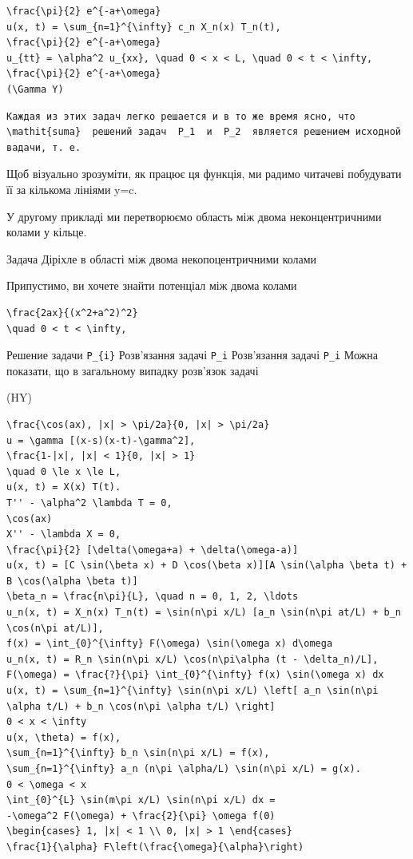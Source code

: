 \documentclass[
  ukrainian,
]{article}
\begin{document}
\begin{verbatim}
\frac{\pi}{2} e^{-a+\omega}
u(x, t) = \sum_{n=1}^{\infty} c_n X_n(x) T_n(t),
\frac{\pi}{2} e^{-a+\omega}
u_{tt} = \alpha^2 u_{xx}, \quad 0 < x < L, \quad 0 < t < \infty,
\frac{\pi}{2} e^{-a+\omega}
(\Gamma Y)
\end{verbatim}

\begin{verbatim}
Каждая из этих задач легко решается и в то же время ясно, что  \mathit{suma}  решений задач  P_1  и  P_2  является решением исходной вадачи, т. е.
\end{verbatim}

Щоб візуально зрозуміти, як працює ця функція, ми радимо читачеві
побудувати її за кількома лініями y=c.

У другому прикладі ми перетворюємо область між двома неконцентричними
колами у кільце.

Задача Діріхле в області між двома некопоцентричними колами

Припустимо, ви хочете знайти потенціал між двома колами

\begin{verbatim}
\frac{2ax}{(x^2+a^2)^2}
\quad 0 < t < \infty,
\end{verbatim}

Решение задачи \texttt{P\_\{i\}} Розв'язання задачі \texttt{P\_i}
Розв'язання задачі \texttt{P\_i} Можна показати, що в загальному випадку
розв'язок задачі

(HY)

\begin{verbatim}
\frac{\cos(ax), |x| > \pi/2a}{0, |x| > \pi/2a}
u = \gamma [(x-s)(x-t)-\gamma^2],
\frac{1-|x|, |x| < 1}{0, |x| > 1}
\quad 0 \le x \le L,
u(x, t) = X(x) T(t).
T'' - \alpha^2 \lambda T = 0,
\cos(ax)
X'' - \lambda X = 0,
\frac{\pi}{2} [\delta(\omega+a) + \delta(\omega-a)]
u(x, t) = [C \sin(\beta x) + D \cos(\beta x)][A \sin(\alpha \beta t) + B \cos(\alpha \beta t)]
\beta_n = \frac{n\pi}{L}, \quad n = 0, 1, 2, \ldots
u_n(x, t) = X_n(x) T_n(t) = \sin(n\pi x/L) [a_n \sin(n\pi at/L) + b_n \cos(n\pi at/L)],
f(x) = \int_{0}^{\infty} F(\omega) \sin(\omega x) d\omega
u_n(x, t) = R_n \sin(n\pi x/L) \cos(n\pi\alpha (t - \delta_n)/L],
F(\omega) = \frac{?}{\pi} \int_{0}^{\infty} f(x) \sin(\omega x) dx
u(x, t) = \sum_{n=1}^{\infty} \sin(n\pi x/L) \left[ a_n \sin(n\pi \alpha t/L) + b_n \cos(n\pi \alpha t/L) \right]
0 < x < \infty
u(x, \theta) = f(x),
\sum_{n=1}^{\infty} b_n \sin(n\pi x/L) = f(x),
\sum_{n=1}^{\infty} a_n (n\pi \alpha/L) \sin(n\pi x/L) = g(x).
0 < \omega < x
\int_{0}^{L} \sin(m\pi x/L) \sin(n\pi x/L) dx =
-\omega^2 F(\omega) + \frac{2}{\pi} \omega f(0)
\begin{cases} 1, |x| < 1 \\ 0, |x| > 1 \end{cases}
\frac{1}{\alpha} F\left(\frac{\omega}{\alpha}\right)
\end{verbatim}
\end{document}

